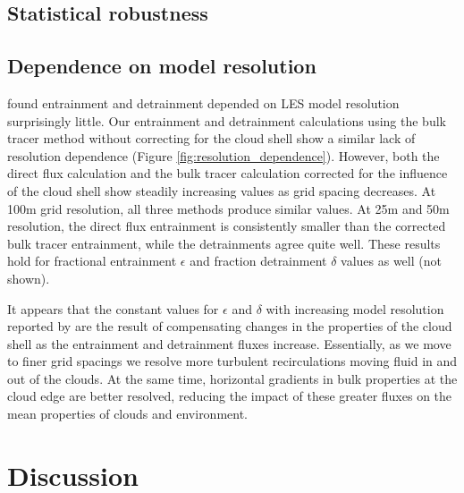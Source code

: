 \documentclass[12pt]{article}
\begin{document}

\subsection{Statistical robustness}



\subsection{Dependence on model resolution}

\cite{Brown1999} found entrainment and detrainment depended on LES model 
resolution surprisingly little.  Our entrainment and detrainment calculations 
using the bulk tracer method without correcting for the cloud shell show a
similar lack of resolution dependence (Figure \ref{fig:resolution_dependence}).
However, both the direct flux calculation and the bulk tracer calculation 
corrected for the influence of the cloud shell show steadily increasing values 
as grid spacing decreases.  At 100m grid resolution, all three methods produce
similar values.  At 25m and 50m resolution, the direct flux entrainment is 
consistently smaller than the corrected bulk tracer entrainment, while the 
detrainments agree quite well.  These results hold for fractional entrainment 
$\epsilon$ and fraction detrainment $\delta$ values as well (not shown).  

It appears that the constant values for $\epsilon$ and $\delta$ with increasing
model resolution reported by \cite{Brown1999} are the result of compensating
changes in the properties of the cloud shell as the entrainment and detrainment
fluxes increase.  Essentially, as we move to finer grid spacings we resolve
more turbulent recirculations moving fluid in and out of the clouds.  At the
same time, horizontal gradients in bulk properties at the cloud edge are better
resolved, reducing the impact of these greater fluxes on the mean properties of 
clouds and environment.


\section{Discussion}
\end{document}

